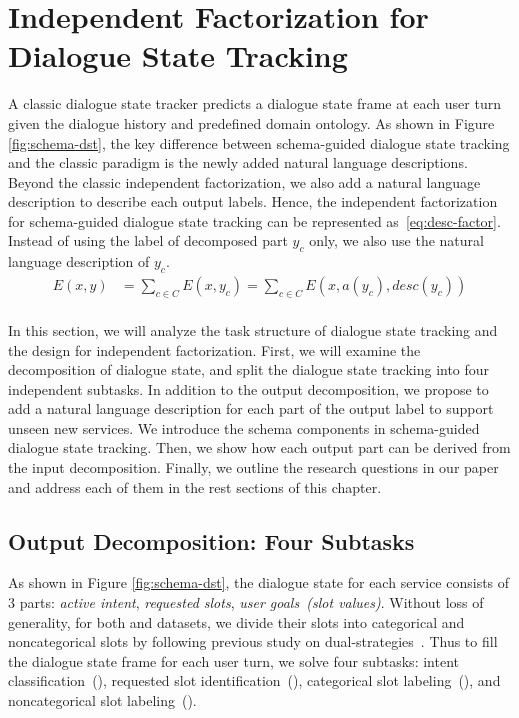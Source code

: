 
\section[Independent Factorization for Dialogue State Tracking]{Independent Factorization for \\Dialogue State Tracking}
\label{sec:sgd:ind-factorization}
A classic dialogue state tracker predicts a dialogue state frame at each
user turn given the dialogue history and predefined domain ontology. As
shown in Figure \ref{fig:schema-dst}, the key difference between
schema-guided dialogue state tracking and the classic paradigm is the
newly added natural language descriptions. Beyond the classic
independent factorization, we also add a natural language description
to describe each output labels. Hence, the independent factorization
for schema-guided dialogue state tracking can be represented
as~\autoref{eq:desc-factor}. Instead of using the label of decomposed
part $y_{c}$ only, we also use the natural language description of
$y_{c}$.
\begin{equation}
    \label{eq:desc-factor}
    \begin{split}
    E(x, y) & =\sum_{c \in C} E(x, y_{c}) = \sum_{c \in C}E(x, a(y_{c}), desc(y_{c}))  \\
    \end{split}
\end{equation}

In this section, we will
analyze the task structure of dialogue state tracking and the design
for independent factorization. First, we will examine the
decomposition of dialogue state, and split the dialogue state tracking
into four independent subtasks. In addition to the output
decomposition, we propose to add a natural language description for
each part of the output label to support unseen new services. We
introduce the schema components in schema-guided dialogue state
tracking. Then, we show how each output part can be derived from the
input decomposition. Finally, we outline the research questions in
our paper and address each of them in the rest sections of this
chapter.

\subsection{Output Decomposition: Four Subtasks}
\label{sec:sgd:decompose-y}
As shown in Figure \ref{fig:schema-dst}, the dialogue state for each
service consists of 3 parts: {\it active intent}, {\it requested
  slots}, {\it user goals~(slot values)}. Without loss of generality,
for both \sgdst and \multiwoz datasets, we divide their slots into
categorical and noncategorical slots by following previous study on
dual-strategies~\citep{zhang2019find}. Thus to fill the dialogue state
frame for each user turn, we solve four  subtasks:
intent classification~(\IC), requested slot identification~(\RSI),
categorical slot labeling~(\CSL), and noncategorical slot
labeling~(\NSL).

